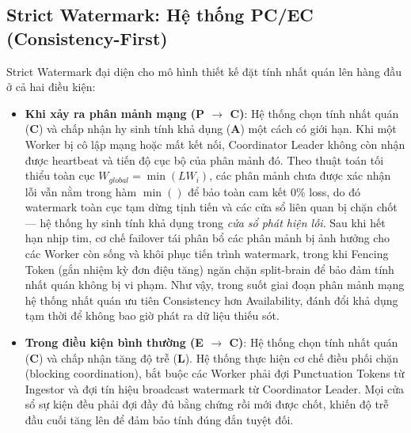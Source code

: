 \documentclass[12pt,a4paper]{article}
\begin{document}
\subsection{Strict Watermark: Hệ thống PC/EC (Consistency-First)}
Strict Watermark đại diện cho mô hình thiết kế đặt tính nhất quán lên hàng đầu ở cả hai điều kiện:
\begin{itemize}
    \item \textbf{Khi xảy ra phân mảnh mạng (P $\rightarrow$ C)}: Hệ thống chọn tính nhất quán (\textbf{C}) và chấp nhận hy sinh tính khả dụng (\textbf{A}) một cách có giới hạn. Khi một Worker bị cô lập mạng hoặc mất kết nối, Coordinator Leader không còn nhận được heartbeat và tiến độ cục bộ của phân mảnh đó. Theo thuật toán tối thiểu toàn cục $W_{global} = \min(LW_i)$, các phân mảnh chưa được xác nhận lỗi vẫn nằm trong hàm $\min()$ để bảo toàn cam kết 0\% loss, do đó watermark toàn cục tạm dừng tịnh tiến và các cửa sổ liên quan bị chặn chốt --- hệ thống hy sinh tính khả dụng trong \emph{cửa sổ phát hiện lỗi}. Sau khi hết hạn nhịp tim, cơ chế failover tái phân bổ các phân mảnh bị ảnh hưởng cho các Worker còn sống và khôi phục tiến trình watermark, trong khi Fencing Token (gắn nhiệm kỳ đơn điệu tăng) ngăn chặn split-brain để bảo đảm tính nhất quán không bị vi phạm. Như vậy, trong suốt giai đoạn phân mảnh mạng hệ thống nhất quán ưu tiên Consistency hơn Availability, đánh đổi khả dụng tạm thời để không bao giờ phát ra dữ liệu thiếu sót.
    \item \textbf{Trong điều kiện bình thường (E $\rightarrow$ C)}: Hệ thống chọn tính nhất quán (\textbf{C}) và chấp nhận tăng độ trễ (\textbf{L}). Hệ thống thực hiện cơ chế điều phối chặn (blocking coordination), bắt buộc các Worker phải đợi Punctuation Tokens từ Ingestor và đợi tín hiệu broadcast watermark từ Coordinator Leader. Mọi cửa sổ sự kiện đều phải đợi đầy đủ bằng chứng rồi mới được chốt, khiến độ trễ đầu cuối tăng lên để đảm bảo tính đúng đắn tuyệt đối.
\end{itemize}
\end{document}
